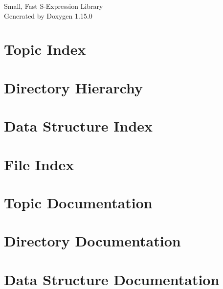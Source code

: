 \documentclass[twoside]{book}
\newcommand{\+}{\discretionary{\mbox{\scriptsize$\hookleftarrow$}}{}{}}
\newcommand{\clearemptydoublepage}{%
    \newpage{\pagestyle{empty}\cleardoublepage}%
  }
\begin{document}
  \raggedbottom
    \hypersetup{pageanchor=false,
                bookmarksnumbered=true,
                pdfencoding=unicode
               }
  \begin{titlepage}
  \vspace*{7cm}
  \begin{center}%
  {\Large Small, Fast S-\/\+Expression Library}\\
  \vspace*{1cm}
  {\large Generated by Doxygen 1.15.0}\\
  \end{center}
  \end{titlepage}
  \clearemptydoublepage
  \tableofcontents
  \clearemptydoublepage
  \hypersetup{pageanchor=true}

\chapter{Topic Index}

\chapter{Directory Hierarchy}

\chapter{Data Structure Index}

\chapter{File Index}

\chapter{Topic Documentation}



\chapter{Directory Documentation}

\chapter{Data Structure Documentation}







\end{document}
